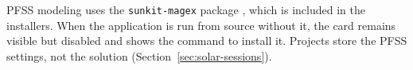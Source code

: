 
\begin{note}
  PFSS modeling uses the \texttt{sunkit-magex} package \parencite{stansby2020}, which is
  included in the installers. When the application is run from source without it, the card
  remains visible but disabled and shows the command to install it. Projects store the PFSS
  settings, not the solution (Section~\ref{sec:solar-sessions}).
\end{note}
